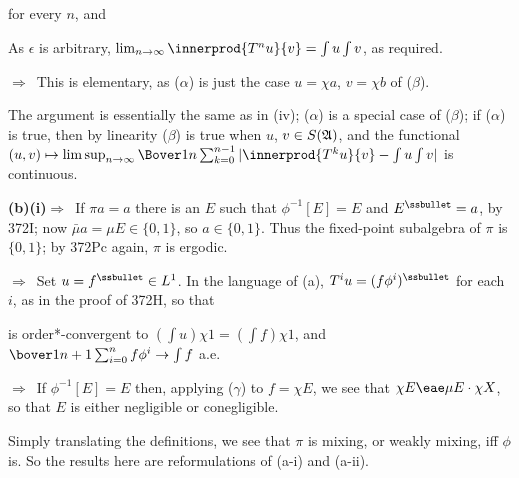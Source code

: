 {\noindent for every $n$, and


\noindent As $\epsilon$ is arbitrary,
$\lim_{n\to\infty}\innerprod{T^nu}{v}=\int u\int v$, as required.

\medskip

\qquad\grheadb$\Rightarrow$\grheada\ This is elementary, as ($\alpha$) is
just the case $u=\chi a$, $v=\chi b$ of ($\beta$).

\medskip

 The argument is essentially the same as in (iv);
($\alpha$) is a special case of ($\beta$);  if ($\alpha$) is true, then by
linearity ($\beta$) is true when $u$, $v\in S(\frak A)$, and the functional
$(u,v)\mapsto\limsup_{n\to\infty}\Bover1n\sum_{k=0}^{n-1}
   |\innerprod{T^ku}{v}-\int u\int v|$ is continuous.

\medskip

{\bf (b)(i)}\grheada$\Rightarrow$\grheadb\  If $\pi a=a$
there is an $E$ such that $\phi^{-1}[E]=E$ and $E^{\ssbullet}=a$, by
372I;  now $\bar\mu a=\mu E\in\{0,1\}$, so $a\in\{0,1\}$.   Thus
the fixed-point subalgebra of $\pi$ is $\{0,1\}$;  by
372Pc again, $\pi$ is ergodic.

\medskip

\qquad\grheadb$\Rightarrow$\grheadc\ Set $u=f^{\ssbullet}\in L^1$.   In
the language of (a), $T^iu=(f\phi^i)^{\ssbullet}$ for each $i$, as in the
proof of 372H, so that


\noindent is order*-convergent to $(\int u)\chi 1=(\int f)\chi 1$, and
$\bover1{n+1}\sum_{i=0}^nf\phi^i\to\int f$ a.e.

\medskip

\qquad\grheadc$\Rightarrow$\grheada\ If $\phi^{-1}[E]=E$ then, applying
($\gamma$) to $f=\chi E$, we see that $\chi E\eae\mu E\cdot\chi X$, so
that $E$ is either negligible or conegligible.

\medskip

 Simply translating the definitions, we see that
$\pi$ is mixing, or weakly mixing, iff $\phi$ is.
So the results here are reformulations of (a-i) and (a-ii).
}%

